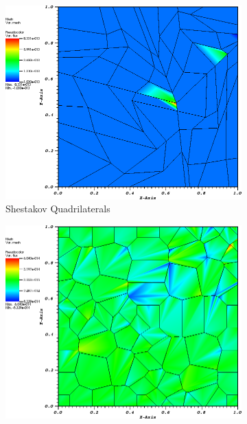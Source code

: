 \begin{figure}
{\begin{subfigure}[b]{0.465\textwidth}
	\end{subfigure}
}
\vspace{3mm}
{
	\begin{subfigure}[b]{0.465\textwidth}
		\centering
		\label{subfig::shes_quad_me_k2_lin_sol}
		\includegraphics[width=\textwidth]{figures/sec_BF/quad_err_shesquad_Wach2.png}
		\caption{Shestakov Quadrilaterals}
	\end{subfigure}
	\hfill
	\begin{subfigure}[b]{0.465\textwidth}
		\centering
		\label{subfig::smooth_poly_me_k2_lin_sol}
		\includegraphics[width=\textwidth]{figures/sec_BF/quad_err_sinepoly_Wach2.png}

\end{subfigure}}
\end{figure}
